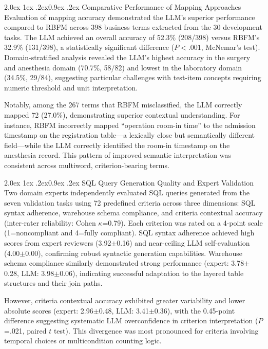 \documentclass[10pt,twocolumn]{article}
\makeatletter
\renewcommand\subsection{\@startsection{subsection}{2}{\z@}%
  {2.0ex \@plus 1ex \@minus .2ex}{0.9ex \@plus .2ex}%
  {\normalfont\normalsize\bfseries}}
\makeatother
\begin{document}
\subsection{Comparative Performance of Mapping Approaches}
Evaluation of mapping accuracy demonstrated the LLM's superior performance
compared to RBFM across 398 business terms extracted from the 30 development
tasks. The LLM achieved an overall accuracy of 52.3\% (208/398) versus RBFM's 32.9\% (131/398), a statistically significant difference ($P<.001$, McNemar's
test). Domain-stratified analysis revealed the LLM's highest accuracy in the
surgery and anesthesia domain (70.7\%, 58/82) and lowest in the laboratory domain (34.5\%, 29/84), suggesting particular challenges with test-item concepts
requiring numeric threshold and unit interpretation.

Notably, among the 267 terms that RBFM misclassified, the LLM correctly mapped 72 (27.0\%), demonstrating superior contextual understanding. For instance, RBFM
incorrectly mapped ``operation room-in time'' to the admission timestamp on the
registration table---a lexically close but semantically different field---while
the LLM correctly identified the room-in timestamp on the anesthesia record.
This pattern of improved semantic interpretation was consistent across
multiword, criterion-bearing terms.

\subsection{SQL Query Generation Quality and Expert Validation}
Two domain experts independently evaluated SQL queries generated from the seven
validation tasks using 72 predefined criteria across three dimensions: SQL
syntax adherence, warehouse schema compliance, and criteria contextual accuracy
(inter-rater reliability: Cohen $\kappa$=0.79). Each criterion was rated on a
4-point scale (1=noncompliant and 4=fully compliant). SQL syntax adherence
achieved high scores from expert reviewers (3.92$\pm$0.16) and near-ceiling LLM self-evaluation (4.00$\pm$0.00), confirming robust syntactic generation
capabilities. Warehouse schema compliance similarly demonstrated strong
performance (expert: 3.78$\pm$0.28, LLM: 3.98$\pm$0.06), indicating successful
adaptation to the layered table structures and their join paths.

However, criteria contextual accuracy exhibited greater variability and lower
absolute scores (expert: 2.96$\pm$0.48, LLM: 3.41$\pm$0.36), with the 0.45-point difference suggesting systematic LLM overconfidence in criterion
interpretation ($P$=.021, paired $t$ test). This divergence was most pronounced
for criteria involving temporal choices or multicondition counting logic.
\end{document}
